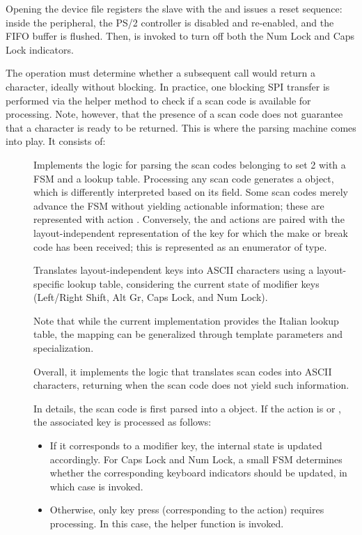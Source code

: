 Opening the device file registers the slave with the  and issues a reset sequence: inside the peripheral, the PS/2 controller is disabled and re-enabled, and the FIFO buffer is flushed. Then,  is invoked to turn off both the Num Lock and Caps Lock indicators.

The  operation must determine whether a subsequent  call would return a character, ideally without blocking. In practice, one blocking SPI transfer is performed via the helper method  to check if a scan code is available for processing. Note, however, that the presence of a scan code does not guarantee that a character is ready to be returned. This is where the parsing machine comes into play. It consists of:
\begin{description}
    \item[] Implements the logic for parsing the scan codes belonging to set 2 with a FSM and a lookup table. Processing any scan code generates a  object, which is differently interpreted based on its  field. Some scan codes merely advance the FSM without yielding actionable information; these are represented with action . Conversely, the  and  actions are paired with the layout-independent representation of the key for which the make or break code has been received; this is represented as an enumerator of  type.

    \item[] Translates layout-independent  keys into ASCII characters using a layout-specific lookup table, considering the current state of modifier keys (Left/Right Shift, Alt Gr, Caps Lock, and Num Lock).
    
    Note that while the current implementation provides the Italian lookup table, the mapping can be generalized through template parameters and specialization.
    
    \item [] Overall, it implements the logic that translates scan codes into ASCII characters, returning  when the scan code does not yield such information.

    In details, the scan code is first parsed into a  object. If the action is  or , the associated key is processed as follows:
    \begin{itemize}
        \item If it corresponds to a modifier key, the internal state is updated accordingly. For Caps Lock and Num Lock, a small FSM determines whether the corresponding keyboard indicators should be updated, in which case  is invoked.
        
        \item Otherwise, only key press (corresponding to the  action) requires processing. In this case, the  helper function is invoked.
    \end{itemize}
\end{description}
